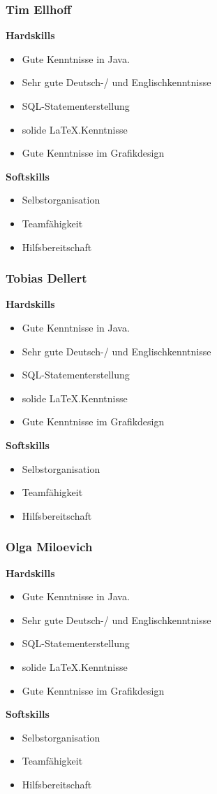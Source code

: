 \documentclass[fontsize=12pt,paper=a4,twoside]{scrartcl}
\begin{document}
\subsubsection{Tim Ellhoff}

\textbf{Hardskills}
\begin{itemize}
\item{Gute Kenntnisse in Java.}
\item{Sehr gute Deutsch-/ und Englischkenntnisse}
\item{SQL-Statementerstellung}
\item{solide \LaTeX.Kenntnisse}
\item{Gute Kenntnisse im Grafikdesign}
\end{itemize}
\textbf{Softskills}
\begin{itemize}
\item{Selbstorganisation}
\item{Teamfähigkeit}
\item{Hilfsbereitschaft}
\end{itemize}

\subsubsection{Tobias Dellert}

\textbf{Hardskills}
\begin{itemize}
\item{Gute Kenntnisse in Java.}
\item{Sehr gute Deutsch-/ und Englischkenntnisse}
\item{SQL-Statementerstellung}
\item{solide \LaTeX.Kenntnisse}
\item{Gute Kenntnisse im Grafikdesign}
\end{itemize}
\textbf{Softskills}
\begin{itemize}
\item{Selbstorganisation}
\item{Teamfähigkeit}
\item{Hilfsbereitschaft}
\end{itemize}

\subsubsection{Olga Miloevich}

\textbf{Hardskills}
\begin{itemize}
\item{Gute Kenntnisse in Java.}
\item{Sehr gute Deutsch-/ und Englischkenntnisse}
\item{SQL-Statementerstellung}
\item{solide \LaTeX.Kenntnisse}
\item{Gute Kenntnisse im Grafikdesign}
\end{itemize}
\textbf{Softskills}
\begin{itemize}
\item{Selbstorganisation}
\item{Teamfähigkeit}
\item{Hilfsbereitschaft}
\end{itemize}
\end{document}
